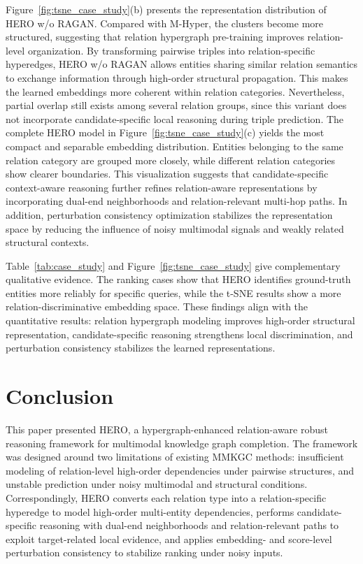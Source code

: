 \documentclass[pdflatex,sn-mathphys-num]{sn-jnl}
\begin{document}
Figure~\ref{fig:tsne_case_study}(b) presents the representation distribution of HERO w/o RAGAN. Compared with M-Hyper, the clusters become more structured, suggesting that relation hypergraph pre-training improves relation-level organization. By transforming pairwise triples into relation-specific hyperedges, HERO w/o RAGAN allows entities sharing similar relation semantics to exchange information through high-order structural propagation. This makes the learned embeddings more coherent within relation categories. Nevertheless, partial overlap still exists among several relation groups, since this variant does not incorporate candidate-specific local reasoning during triple prediction. The complete HERO model in Figure~\ref{fig:tsne_case_study}(c) yields the most compact and separable embedding distribution. Entities belonging to the same relation category are grouped more closely, while different relation categories show clearer boundaries. This visualization suggests that candidate-specific context-aware reasoning further refines relation-aware representations by incorporating dual-end neighborhoods and relation-relevant multi-hop paths. In addition, perturbation consistency optimization stabilizes the representation space by reducing the influence of noisy multimodal signals and weakly related structural contexts.

Table~\ref{tab:case_study} and Figure~\ref{fig:tsne_case_study} give complementary qualitative evidence. The ranking cases show that HERO identifies ground-truth entities more reliably for specific queries, while the t-SNE results show a more relation-discriminative embedding space. These findings align with the quantitative results: relation hypergraph modeling improves high-order structural representation, candidate-specific reasoning strengthens local discrimination, and perturbation consistency stabilizes the learned representations.

\section{Conclusion}
\label{sec:conclusion}
This paper presented HERO, a hypergraph-enhanced relation-aware robust reasoning framework for multimodal knowledge graph completion. The framework was designed around two limitations of existing MMKGC methods: insufficient modeling of relation-level high-order dependencies under pairwise structures, and unstable prediction under noisy multimodal and structural conditions. Correspondingly, HERO converts each relation type into a relation-specific hyperedge to model high-order multi-entity dependencies, performs candidate-specific reasoning with dual-end neighborhoods and relation-relevant paths to exploit target-related local evidence, and applies embedding- and score-level perturbation consistency to stabilize ranking under noisy inputs.
\end{document}
